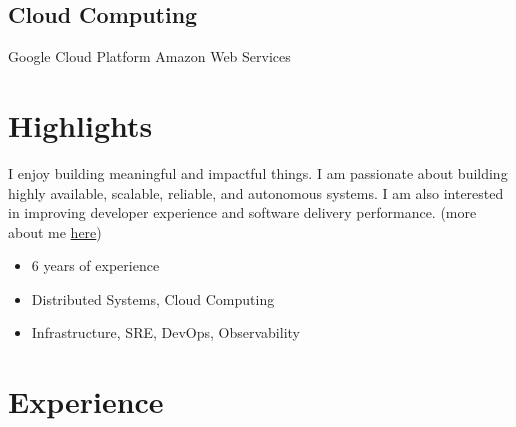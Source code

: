 \documentclass[]{cv-style}                     %
\begin{document}
\begin{aside}
\section{Cloud Computing}
Google Cloud Platform
Amazon Web Services
%
%
\end{aside}



\section{Highlights}

I enjoy building meaningful and impactful things.
I am passionate about building highly available, scalable, reliable, and autonomous systems.
I am also interested in improving developer experience and software delivery performance.
(more about me \href{https://milad.dev/about}{here})

\begin{itemize}
  \setlength{\itemsep}{-4pt}
  \item 6 years of experience
  \item Distributed Systems, Cloud Computing
  \item Infrastructure, SRE, DevOps, Observability
\end{itemize}



\section{Experience}
\end{document}
